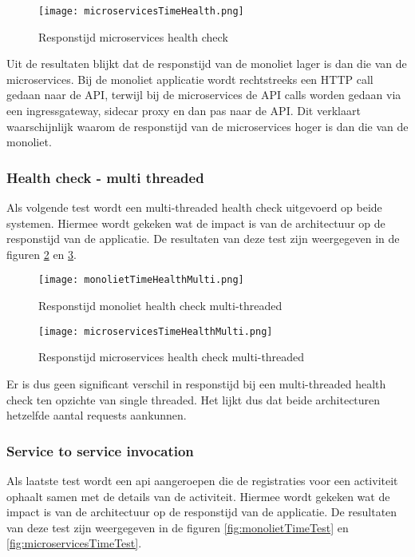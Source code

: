 \begin{figure}[H]
    \centering	
    \texttt{[image: microservicesTimeHealth.png]}
    \caption{Responstijd microservices health check} 
    \label{fig:microservicesTimeHealth}
\end{figure}

Uit de resultaten blijkt dat de responstijd van de monoliet lager is dan die van de microservices. Bij de monoliet applicatie wordt rechtstreeks een HTTP call gedaan naar de API, terwijl bij de microservices de API calls worden gedaan via een ingressgateway, sidecar proxy en dan pas naar de API. Dit verklaart waarschijnlijk waarom de responstijd van de microservices hoger is dan die van de monoliet.
\subsubsection*{Health check - multi threaded}
Als volgende test wordt een multi-threaded health check uitgevoerd op beide systemen. Hiermee wordt gekeken wat de impact is van de architectuur op de responstijd van de applicatie. De resultaten van deze test zijn weergegeven in de figuren \ref{fig:monolietTimeHealthMulti} en \ref{fig:microservicesTimeHealthMulti}.

\begin{figure}[H]
    \centering	
    \texttt{[image: monolietTimeHealthMulti.png]}
    \caption{Responstijd monoliet health check multi-threaded} 
    \label{fig:monolietTimeHealthMulti}
\end{figure}

\begin{figure}[H]
    \centering	
    \texttt{[image: microservicesTimeHealthMulti.png]}
    \caption{Responstijd microservices health check multi-threaded} 
    \label{fig:microservicesTimeHealthMulti}
\end{figure}

Er is dus geen significant verschil in responstijd bij een multi-threaded health check ten opzichte van single threaded. Het lijkt dus dat beide architecturen hetzelfde aantal requests aankunnen.
\subsubsection*{Service to service invocation}
Als laatste test wordt een api aangeroepen die de registraties voor een activiteit ophaalt samen met de details van de activiteit. Hiermee wordt gekeken wat de impact is van de architectuur op de responstijd van de applicatie. De resultaten van deze test zijn weergegeven in de figuren \ref{fig:monolietTimeTest} en \ref{fig:microservicesTimeTest}.

